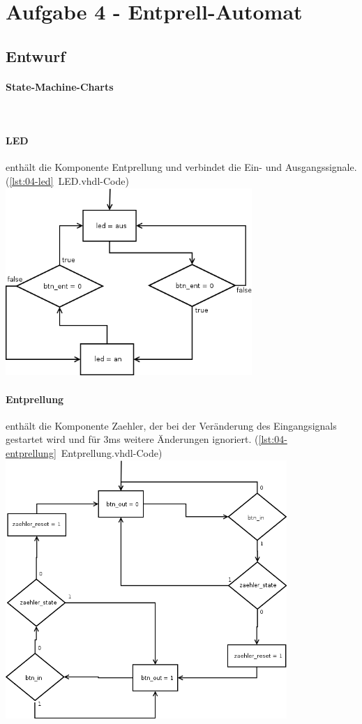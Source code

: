 \section{Aufgabe 4 - Entprell-Automat}
\subsection{Entwurf}
	\paragraph{State-Machine-Charts}\hfill \\

	\paragraph{LED} enthält die Komponente Entprellung und verbindet die Ein- und Ausgangssignale. (\ref{lst:04-led}~LED.vhdl-Code) \\
	\includegraphics[width=0.7\textwidth]{resources/04-led.png}
	
	\paragraph{Entprellung} enthält die Komponente Zaehler, der bei der Veränderung des Eingangsignals gestartet wird und für 3ms weitere Änderungen ignoriert. (\ref{lst:04-entprellung}~Entprellung.vhdl-Code) \\
	\includegraphics[width=0.8\textwidth]{resources/04-entpreller.png}


